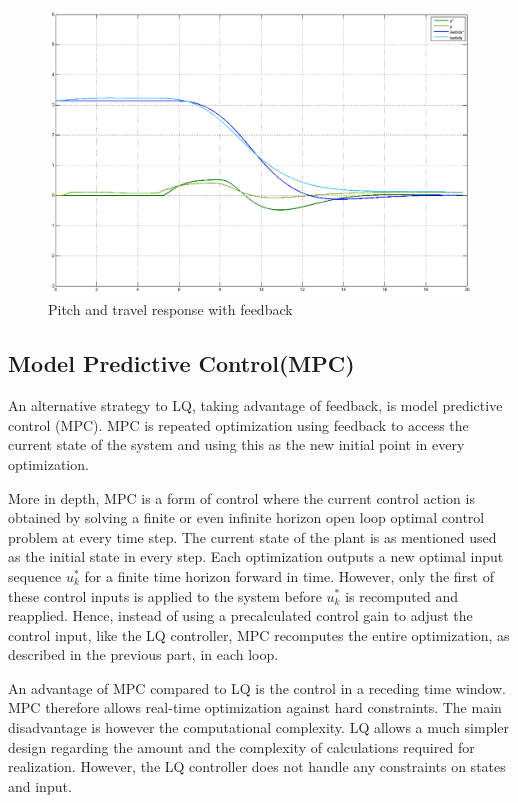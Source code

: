\documentclass[a4paper, 12pt]{article}\usepackage[utf8]{inputenc}
\begin{document}
\begin{figure}[H]
    \centering
    \includegraphics[width=130mm]{Part3/pitch+travel_plot_with_feedback.PNG}
    \caption{Pitch and travel response with feedback}
    \label{fig:plot_3}
\end{figure}

\subsection{Model Predictive Control(MPC)}
An alternative strategy to LQ, taking advantage of feedback, is model predictive control (MPC). MPC is repeated optimization using feedback to access the current state of the system and using this as the new initial point in every optimization.

More in depth, MPC is a form of control where the current control action is obtained by solving a finite or even infinite horizon open loop optimal control problem at every time step. The current state of the plant is as mentioned used as the initial state in every step. Each optimization outputs a new optimal input sequence $u_{k}^*$ for a finite time horizon forward in time. However, only the first of these control inputs is applied to the system before $u_{k}^*$ is recomputed and reapplied. Hence, instead of using a precalculated control gain to  adjust the control input, like the LQ controller, MPC recomputes the entire optimization, as described in the previous part, in each loop. \citep{ResearchGate}

An advantage of MPC compared to LQ is the control in a receding time window. MPC therefore allows real-time optimization against hard constraints. The main disadvantage is however the computational complexity. LQ allows a much simpler design regarding the amount and the complexity of calculations required for realization. However, the LQ controller does not handle any constraints on states and input. 
\end{document}
